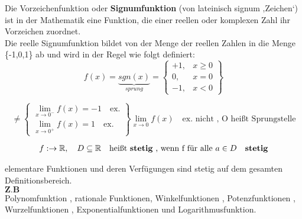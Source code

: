 \begin{example}

\begin{definition}[ sgn(x)]
Die Vorzeichenfunktion oder \textbf{Signumfunktion} (von lateinisch signum ‚Zeichen‘) ist in der Mathematik eine Funktion, die einer reellen oder komplexen Zahl ihr Vorzeichen zuordnet.\\
Die reelle Signumfunktion bildet von der Menge der reellen Zahlen in die Menge \{-1,0,1\} ab und wird in der Regel wie folgt definiert:
$$ f(x) = \underbrace{sgn(x)}_{sprung}  =  \left\{\begin{array}{lr}
+ 1 , & x \geq 0\\
0 , & x = 0 \\
-1 , & x < 0 
        \end{array}\right\}$$ 
\end{definition}
$$
\neq \left\{\begin{array}{lr}
  \lim\limits_{x \rightarrow 0^-}{f(x)} = -1 \quad \text{ex.} \\
        \lim\limits_{x \rightarrow 0^+}{f(x)} = 1 \quad \text{ex.} 
        \end{array}\right\} \lim\limits_{x \rightarrow 0}{f(x)} \quad \text{ex. nicht , O heißt Sprungstelle}
$$  
\end{example}
\newpage
\begin{definition}
\begin{align*}
f : \rightarrow \mathbb{R} , \quad D \subseteq \mathbb{R} \quad \text{heißt \textbf{stetig} , wenn f für alle } a \in D \quad \textbf{stetig} 
\end{align*}
\end{definition}
\begin{example}
elementare Funktionen und deren Verfügungen sind stetig auf dem gesamten Definitionsbereich. \\
$\textbf{Z.B}$ \\
Polynomfunktion , rationale Funktionen, Winkelfunktionen , Potenzfunktionen , Wurzelfunktionen , Exponentialfunktionen und Logarithmusfunktion.
     
\end{example}

